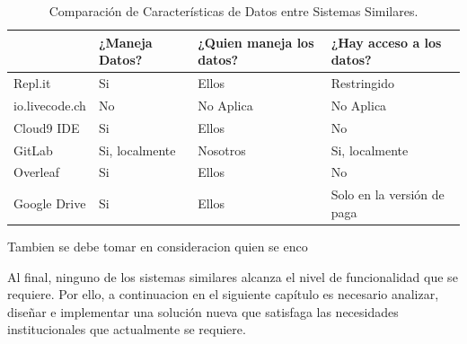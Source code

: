 \begin{table}[h!]
	\small
    \begin{tabular}{|p{}|p{}|p{}|p{}|}
      \hline
              			& ¿Maneja Datos?	& ¿Quien maneja los \mbox{datos}?	& ¿Hay acceso a los \mbox{datos}?	\\
      \hline
      Repl.it			&	Si				&	Ellos			& Restringido						\\
      \hline
      io.livecode.ch	&	No				&	No Aplica		& No Aplica							\\
      \hline
      Cloud9 IDE		&	Si				&	Ellos			& No								\\
      \hline
      GitLab			&	Si, localmente	&	Nosotros		& Si, localmente					\\
      \hline
      Overleaf			&	Si				&	Ellos			& No								\\
      \hline
      Google Drive		&	Si				&	Ellos			& Solo en la versión de paga		\\
      \hline
    \end{tabular}
	\caption{Comparación de Características de Datos entre \mbox{Sistemas} Similares.}
    \label{comparacion-sistemas-similares-4}
\end{table}

Tambien se debe tomar en consideracion quien se enco

Al final, ninguno de los sistemas similares alcanza el nivel de funcionalidad que se requiere. Por ello, a continuacion en el siguiente capítulo es necesario analizar, diseñar e implementar una solución nueva que satisfaga las necesidades institucionales que actualmente se requiere.
